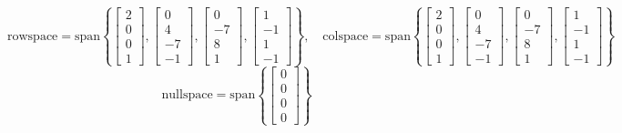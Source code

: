 \documentclass{article}
\begin{document}
$$\text{rowspace} = \text{span}\left\{ \begin{bmatrix} 2 \\ 0 \\ 0 \\ 1 \end{bmatrix}, \begin{bmatrix} 0 \\ 4 \\ -7 \\ -1 \end{bmatrix}, \begin{bmatrix} 0 \\ -7 \\ 8 \\ 1 \end{bmatrix}, \begin{bmatrix} 1 \\ -1 \\ 1 \\ -1 \end{bmatrix} \right\}
, \quad
\text{colspace} = \text{span}\left\{ \begin{bmatrix} 2 \\ 0 \\ 0 \\ 1 \end{bmatrix}, \begin{bmatrix} 0 \\ 4 \\ -7 \\ -1 \end{bmatrix}, \begin{bmatrix} 0 \\ -7 \\ 8 \\ 1 \end{bmatrix}, \begin{bmatrix} 1 \\ -1 \\ 1 \\ -1 \end{bmatrix} \right\}
$$ $$
\text{nullspace} = \text{span}\left\{ \begin{bmatrix} 0 \\ 0 \\ 0 \\ 0 \end{bmatrix} \right\}
$$
\end{document}
